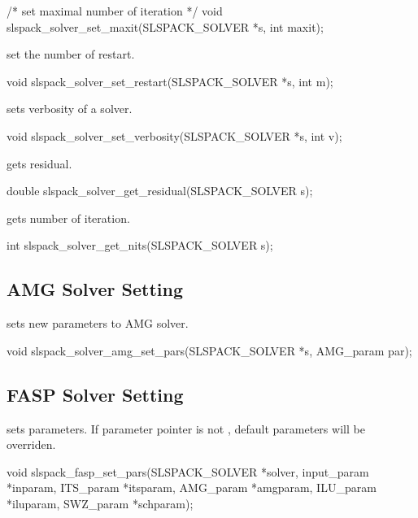 \begin{evb}
/* set maximal number of iteration */
void slspack_solver_set_maxit(SLSPACK_SOLVER *s, int maxit);
\end{evb}

 set the number of restart.
\begin{evb}
void slspack_solver_set_restart(SLSPACK_SOLVER *s, int m);
\end{evb}

 sets verbosity of a solver.
\begin{evb}
void slspack_solver_set_verbosity(SLSPACK_SOLVER *s, int v);
\end{evb}

 gets residual.
\begin{evb}
double slspack_solver_get_residual(SLSPACK_SOLVER s);
\end{evb}

 gets number of iteration.
\begin{evb}
int slspack_solver_get_nits(SLSPACK_SOLVER s);
\end{evb}

\subsection{AMG Solver Setting}
 sets new parameters to AMG solver.
\begin{evb}
void slspack_solver_amg_set_pars(SLSPACK_SOLVER *s, AMG_param par);
\end{evb}

\subsection{FASP Solver Setting}
 sets parameters. If parameter pointer is not ,
default parameters will be overriden.
\begin{evb}
void slspack_fasp_set_pars(SLSPACK_SOLVER *solver, input_param *inparam,
    ITS_param *itsparam, AMG_param *amgparam, ILU_param *iluparam,
    SWZ_param *schparam);
\end{evb}

